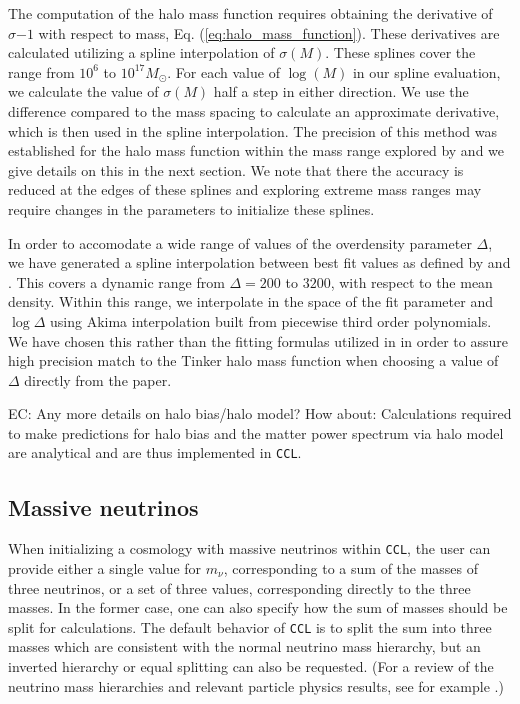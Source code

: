 \documentclass[\docopts]{\docclass}
\newcommand{\elisa}[1]{\textcolor{green!10!orange!90!}{EC: #1}}
\newcommand{\ccl}{{\tt CCL}\xspace}
\begin{document}
The computation of the halo mass function requires obtaining the derivative of $\sigma{-1}$ with respect to mass, Eq. (\ref{eq:halo_mass_function}). These derivatives are calculated utilizing a spline interpolation of $\sigma(M)$. These splines cover the range from $10^6$ to $10^{17} M_\odot$. For each value of $\log(M)$ in our spline evaluation, we calculate the value of $\sigma(M)$ half a step in either direction. We use the difference compared to the mass spacing to calculate an approximate derivative, which is then used in the spline interpolation. The precision of this method was established for the halo mass function within the mass range explored by \citet{Tinker2010} and we give details on this in the next section. We note that there the accuracy is reduced at the edges of these splines and exploring extreme mass ranges may require changes in the parameters to initialize these splines.

In order to accomodate a wide range of values of the overdensity parameter $\Delta$, we have generated a spline interpolation between best fit values as defined by \citet{Tinker2008} and \citet{Tinker2010}. This covers a dynamic range from $\Delta=200$ to $3200$, with respect to the mean density. Within this range, we interpolate in the space of the fit parameter and $\log\Delta$ using Akima interpolation built from piecewise third order polynomials. We have chosen this rather than the fitting formulas utilized in \citet{Tinker2010} in order to assure high precision match to the Tinker halo mass function when choosing a value of $\Delta$ directly from the paper. 

\elisa{Any more details on halo bias/halo model? How about:} Calculations required to make predictions for halo bias and the matter power spectrum via halo model are analytical and are thus implemented in \ccl.

\subsection{Massive neutrinos}

When initializing a cosmology with massive neutrinos within \ccl , the user can provide either a single value for $m_\nu$, corresponding to a sum of the masses of three neutrinos, or a set of three values, corresponding directly to the three masses. In the former case, one can also specify how the sum of masses should be split for calculations. The default behavior of \ccl is to split the sum into three masses which are consistent with the normal neutrino mass hierarchy, but an inverted hierarchy or equal splitting can also be requested. (For a review of the neutrino mass hierarchies and relevant particle physics results, see for example \citealt{Gerbino2017, Lesgourgues2012}.)
\end{document}
